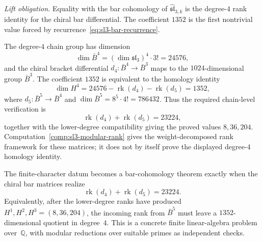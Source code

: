 \begin{hypothesis}
\emph{Lift obligation.} Equality with the bar cohomology of
$\widehat{\mathfrak{sl}}_{3,k}$ is the degree-$4$ rank identity for the
chiral bar differential. The coefficient $1352$ is the first
nontrivial value forced by recurrence~\eqref{eq:sl3-bar-recurrence}.

The degree-$4$ chain group has dimension
\[
\dim \bar{B}^4
=(\dim\mathfrak{sl}_3)^4\cdot 3!
=24576,
\]
and the chiral bracket differential
$d_4\colon\bar B^4\to\bar B^3$ maps to the
$1024$-dimensional group $\bar B^3$. The coefficient
$1352$ is equivalent to the homology identity
\[
\dim H^4
=
24576-\operatorname{rk}(d_4)-\operatorname{rk}(d_5)
=1352,
\]
where $d_5\colon\bar B^5\to\bar B^4$ and
$\dim\bar B^5=8^5\cdot4!=786432$. Thus the required chain-level
verification is
\[
\operatorname{rk}(d_4)+\operatorname{rk}(d_5)=23224,
\]
together with the lower-degree compatibility giving the proved
values $8,36,204$. Computation~\ref{comp:sl3-modular-rank} gives the
weight-decomposed rank framework for these matrices; it does not by
itself prove the displayed degree-$4$ homology identity.
\end{hypothesis}

\begin{remark}
The finite-character datum becomes a bar-cohomology theorem exactly
when the chiral bar matrices realize
\[
\operatorname{rk}(d_4)+\operatorname{rk}(d_5)=23224.
\]
Equivalently, after the lower-degree ranks have produced
$H^1,H^2,H^3=(8,36,204)$, the incoming rank from
$\bar B^5$ must leave a $1352$-dimensional quotient in degree~$4$.
This is a concrete finite linear-algebra problem over~$\mathbb Q$,
with modular reductions over suitable primes as independent checks.
\end{remark}

